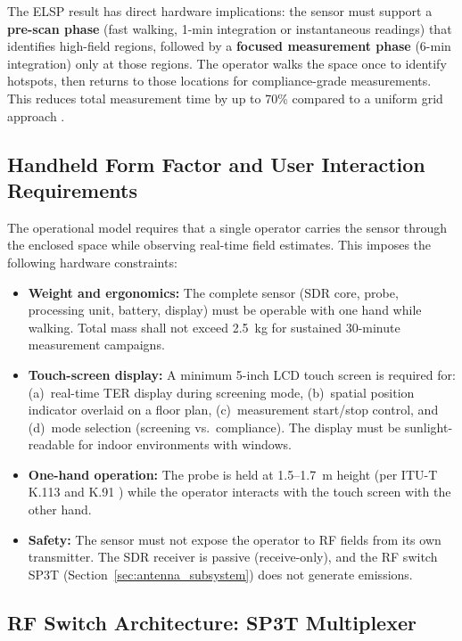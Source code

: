 \documentclass[11pt,a4paper]{article}
\begin{document}
\noindent The ELSP result has direct hardware implications: the sensor must support a \textbf{pre-scan phase} (fast walking, 1-min integration or instantaneous readings) that identifies high-field regions, followed by a \textbf{focused measurement phase} (6-min integration) only at those regions. The operator walks the space once to identify hotspots, then returns to those locations for compliance-grade measurements. This reduces total measurement time by up to 70\% compared to a uniform grid approach \cite{martinezgonzalez_2022}.

\subsection{Handheld Form Factor and User Interaction Requirements}

The operational model requires that a single operator carries the sensor through the enclosed space while observing real-time field estimates. This imposes the following hardware constraints:

\begin{itemize}
    \item \textbf{Weight and ergonomics:} The complete sensor (SDR core, probe, processing unit, battery, display) must be operable with one hand while walking. Total mass shall not exceed 2.5~kg for sustained 30-minute measurement campaigns.
    \item \textbf{Touch-screen display:} A minimum 5-inch LCD touch screen is required for: (a)~real-time TER display during screening mode, (b)~spatial position indicator overlaid on a floor plan, (c)~measurement start/stop control, and (d)~mode selection (screening vs.~compliance). The display must be sunlight-readable for indoor environments with windows.
    \item \textbf{One-hand operation:} The probe is held at 1.5--1.7~m height (per ITU-T K.113 \cite{itut_k113} and K.91 \cite{itut_k91}) while the operator interacts with the touch screen with the other hand.
    \item \textbf{Safety:} The sensor must not expose the operator to RF fields from its own transmitter. The SDR receiver is passive (receive-only), and the RF switch SP3T (Section~\ref{sec:antenna_subsystem}) does not generate emissions.
\end{itemize}

\subsection{RF Switch Architecture: SP3T Multiplexer}
\end{document}
